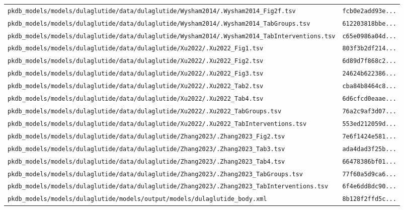 \documentclass{article}
\begin{document}
\begin{longtable}{ll}
\texttt{pkdb\_models/models/dulaglutide/data/dulaglutide/Wysham2014/.Wysham2014\_Fig2f.tsv} & \texttt{fcb0e2add93e...} \\
\texttt{pkdb\_models/models/dulaglutide/data/dulaglutide/Wysham2014/.Wysham2014\_TabGroups.tsv} & \texttt{612203818bbe...} \\
\texttt{pkdb\_models/models/dulaglutide/data/dulaglutide/Wysham2014/.Wysham2014\_TabInterventions.tsv} & \texttt{c65e0986a04d...} \\
\texttt{pkdb\_models/models/dulaglutide/data/dulaglutide/Xu2022/.Xu2022\_Fig1.tsv} & \texttt{803f3b2df214...} \\
\texttt{pkdb\_models/models/dulaglutide/data/dulaglutide/Xu2022/.Xu2022\_Fig2.tsv} & \texttt{6d89d7f868c2...} \\
\texttt{pkdb\_models/models/dulaglutide/data/dulaglutide/Xu2022/.Xu2022\_Fig3.tsv} & \texttt{24624b622386...} \\
\texttt{pkdb\_models/models/dulaglutide/data/dulaglutide/Xu2022/.Xu2022\_Tab2.tsv} & \texttt{cba84b8464c8...} \\
\texttt{pkdb\_models/models/dulaglutide/data/dulaglutide/Xu2022/.Xu2022\_Tab4.tsv} & \texttt{6d6cfcd0eaae...} \\
\texttt{pkdb\_models/models/dulaglutide/data/dulaglutide/Xu2022/.Xu2022\_TabGroups.tsv} & \texttt{76a2c9af3d07...} \\
\texttt{pkdb\_models/models/dulaglutide/data/dulaglutide/Xu2022/.Xu2022\_TabInterventions.tsv} & \texttt{553ed212059d...} \\
\texttt{pkdb\_models/models/dulaglutide/data/dulaglutide/Zhang2023/.Zhang2023\_Fig2.tsv} & \texttt{7e6f1424e581...} \\
\texttt{pkdb\_models/models/dulaglutide/data/dulaglutide/Zhang2023/.Zhang2023\_Tab3.tsv} & \texttt{ada4dad3f25b...} \\
\texttt{pkdb\_models/models/dulaglutide/data/dulaglutide/Zhang2023/.Zhang2023\_Tab4.tsv} & \texttt{66478386bf01...} \\
\texttt{pkdb\_models/models/dulaglutide/data/dulaglutide/Zhang2023/.Zhang2023\_TabGroups.tsv} & \texttt{77f60a5d9ca6...} \\
\texttt{pkdb\_models/models/dulaglutide/data/dulaglutide/Zhang2023/.Zhang2023\_TabInterventions.tsv} & \texttt{6f4e6dd8dc90...} \\
\texttt{pkdb\_models/models/dulaglutide/models/output/models/dulaglutide\_body.xml} & \texttt{8b128f2ffd5c...} \\
\end{longtable}
\end{document}
